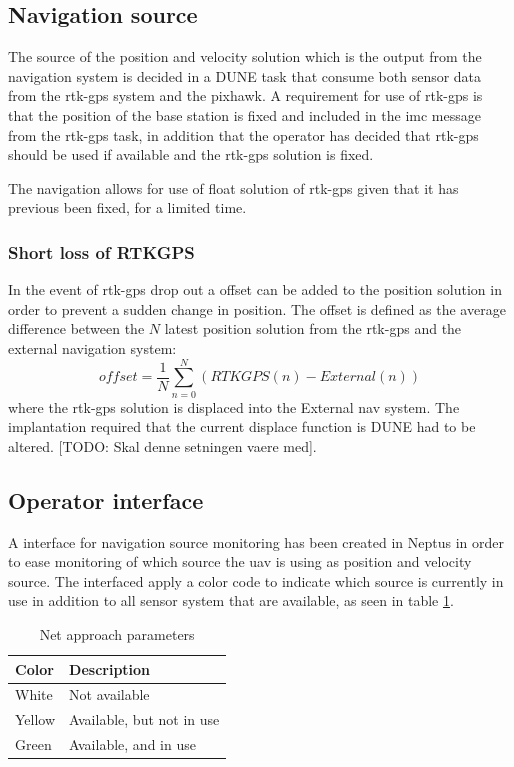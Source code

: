 \subsection{Navigation source}
The source of the position and velocity solution which is the output from the navigation system is decided in a DUNE task that consume both sensor data from the \gls{rtk-gps} system and the pixhawk. A requirement for use of \gls{rtk-gps} is that the position of the base station is fixed and included in the \gls{imc} message from the \gls{rtk-gps} task, in addition that the operator has decided that \gls{rtk-gps} should be used if available and the \gls{rtk-gps} solution is fixed.

The navigation allows for use of float solution of \gls{rtk-gps} given that it has previous been fixed, for a limited time.

\subsubsection{Short loss of RTKGPS}
In the event of \gls{rtk-gps} drop out a offset can be added to the position solution in order to prevent a sudden change in position. The offset is defined as the average difference between the $N$ latest position solution from the \gls{rtk-gps} and the external navigation system:
\begin{equation}
offset = \frac{1}{N}\sum_{n=0}^N(RTKGPS(n)-External(n))
\end{equation}
where the \gls{rtk-gps} solution is displaced into the External nav system. The implantation required that the current displace function is DUNE had to be altered. [TODO: Skal denne setningen vaere med].
\subsection{Operator interface}
A interface for navigation source monitoring has been created in Neptus in order to ease monitoring of which source the \gls{uav} is using as position and velocity source. The interfaced apply a color code to indicate which source is currently in use in addition to all sensor system that are available, as seen in table \ref{Tb:Color Code}.

\begin{table}[H]
\begin{center}
    \begin{tabular}{ | l | l |}
    \hline
    \textbf{Color} & \textbf{Description} \\ \hline
    White & Not available \\ \hline
    Yellow & Available, but not in use \\ \hline
    Green & Available, and in use \\ \hline
    \end{tabular}
\end{center}
\caption{Net approach parameters }
\label{Tb:Color Code}
\end{table}

